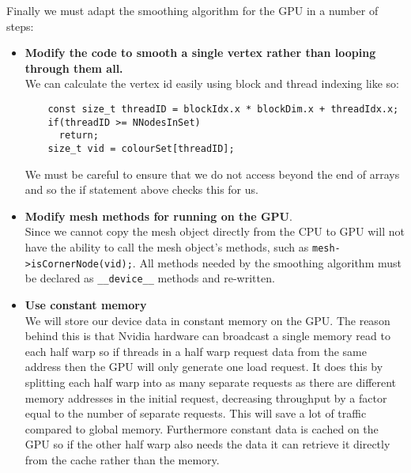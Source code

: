 Finally we must adapt the smoothing algorithm for the GPU in a number of steps:
\begin{itemize}
  \item \textbf{Modify the code to smooth a single vertex rather than looping through them all.} \\
        We can calculate the vertex id easily using block and thread indexing like so:
        \begin{verbatim}
    const size_t threadID = blockIdx.x * blockDim.x + threadIdx.x;
    if(threadID >= NNodesInSet)
      return;
    size_t vid = colourSet[threadID];
        \end{verbatim}
        We must be careful to ensure that we do not access beyond the end of arrays and so the if statement above checks this for us.
  \item \textbf{Modify mesh methods for running on the GPU}. \\
        Since we cannot copy the mesh object directly from the CPU to GPU will not have the ability to call the mesh object's methods, such as \verb!mesh->isCornerNode(vid);!. All methods needed by the smoothing algorithm must be declared as \verb!__device__! methods and re-written.
  \item \textbf{Use constant memory}\\
        We will store our device data in constant memory on the GPU. The reason behind this is that Nvidia hardware can broadcast a single memory read to each half warp so if threads in a half warp request data from the same address then the GPU will only generate one load request\cite{const_mem}. It does this by splitting each half warp into as many separate requests as there are different memory addresses in the initial request, decreasing throughput by a factor equal to the number of separate requests\cite{half_warp_broadcast}. This will save a lot of traffic compared to global memory.
        Furthermore constant data is cached on the GPU so if the other half warp also needs the data it can retrieve it directly from the cache rather than the memory.

\end{itemize}

